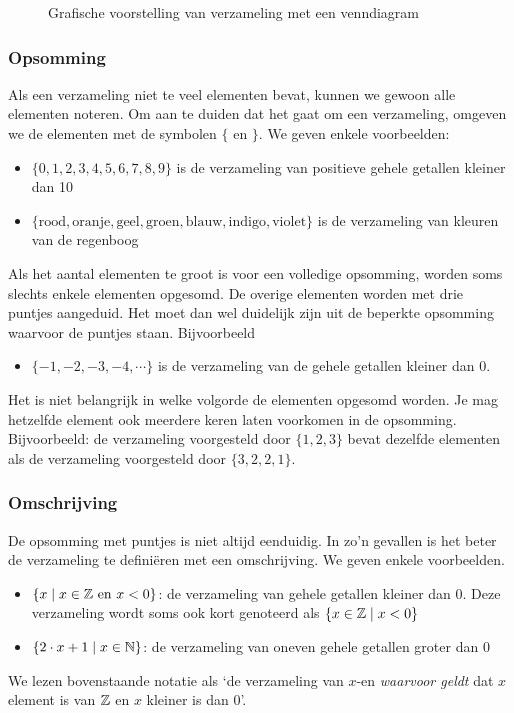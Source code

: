 \begin{figure}[htbp]
\centering
{}\qquad
{}
\caption{Grafische voorstelling van verzameling met een venndiagram}
\label{fig:venndiagram}
\end{figure}

\subsubsection{Opsomming}
Als een verzameling niet te veel elementen bevat, kunnen we gewoon alle elementen noteren. Om aan te duiden dat het gaat om een verzameling, omgeven we de elementen met de symbolen $\{$ en $\}$. We geven enkele voorbeelden:
\begin{itemize}
\item $\{0,1,2,3,4,5,6,7,8,9\}$ is de verzameling van positieve gehele getallen kleiner dan 10
\item $\{ \mathrm{ rood, oranje, geel, groen, blauw, indigo, violet}\}$ is de verzameling van kleuren van de regenboog
\end{itemize}
Als het aantal elementen te groot is voor een volledige opsomming, worden soms slechts enkele elementen opgesomd. De overige elementen worden met drie puntjes aangeduid. Het moet dan wel duidelijk zijn uit de beperkte opsomming waarvoor de puntjes staan. Bijvoorbeeld
\begin{itemize}
\item $\{-1,-2,-3,-4,\cdots \}$ is de verzameling van de gehele getallen kleiner dan 0.
\end{itemize}

Het is niet belangrijk in welke volgorde de elementen opgesomd worden. Je mag hetzelfde element ook meerdere keren laten voorkomen in de opsomming. Bijvoorbeeld: de verzameling voorgesteld door $\{1,2,3\}$ bevat dezelfde elementen als de verzameling voorgesteld door $\{3,2,2,1\}$.

\subsubsection{Omschrijving}
De opsomming met puntjes is niet altijd eenduidig. In zo'n gevallen is het beter de verzameling te defini\"eren met een omschrijving. We geven enkele voorbeelden.
\begin{itemize}
\item $\{x\mid x \in \mathbb{Z} ~\mathrm{ en }~ x<0\}$: de verzameling van gehele getallen kleiner dan 0. Deze verzameling wordt soms ook kort genoteerd als $\{x \in \mathbb{Z} \mid x<0\}$
\item $\{ 2\cdot x +1 \mid x \in \mathbb{N}\}$: de verzameling van oneven gehele getallen groter dan 0
\end{itemize}
We lezen bovenstaande notatie als `de verzameling van $x$-en \emph{waarvoor geldt} dat $x$ element is van $\mathbb{Z}$ en $x$ kleiner is dan 0'.

